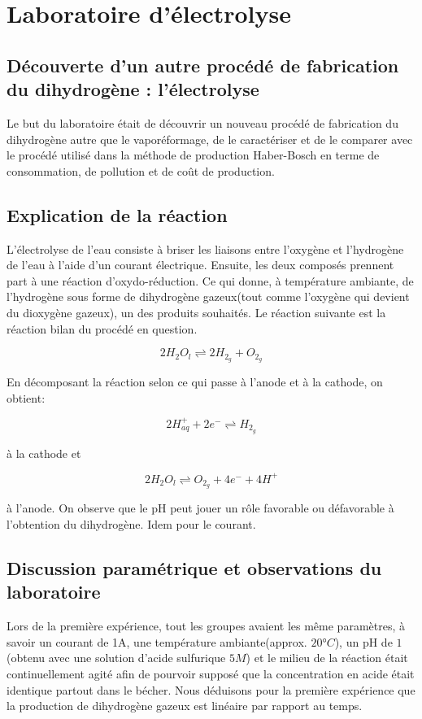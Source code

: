 \section{Laboratoire d'électrolyse}
\subsection{Découverte d'un autre procédé de fabrication du dihydrogène : l'électrolyse}
Le but du laboratoire était de découvrir un nouveau procédé de
fabrication du dihydrogène autre que le vaporéformage, de le
caractériser et de le comparer avec le procédé utilisé dans la
méthode de production Haber-Bosch en terme de consommation, de
pollution et de coût de production.

\subsection{Explication de la réaction}
L'électrolyse de l'eau consiste à briser les liaisons entre
l'oxygène et l'hydrogène de l'eau à l'aide d'un courant électrique.
Ensuite, les deux composés prennent part à une réaction d'oxydo-réduction.
Ce qui donne, à température ambiante, de l'hydrogène sous forme de
dihydrogène gazeux(tout comme l'oxygène qui devient du dioxygène gazeux),
un des produits souhaités. Le réaction suivante est la réaction bilan du
procédé en question.

$$2H_{2}O_{l} \rightleftharpoons 2 H_{2}_{g} + O_{2}_{g}$$

En décomposant la réaction selon ce qui passe à l'anode et à la cathode, 
on obtient:

$$2H^{+}_{aq} + 2 e^{-} \rightleftharpoons H_{2}_{g}$$

à la cathode et

$$2H_{2}O_{l} \rightleftharpoons O_{2}_{g} + 4 e^{-} + 4 H^{+}$$

à l'anode. On observe que le pH peut jouer un rôle favorable ou 
défavorable à l'obtention du dihydrogène. Idem pour le courant.

\subsection{Discussion paramétrique et observations du laboratoire}
Lors de la première expérience, tout les groupes avaient les même paramètres,
à savoir un courant de \unit{1}{A}, une température ambiante(approx. $20°C$),
un pH de $1$(obtenu avec une solution d'acide sulfurique $5M$) et le milieu de
la réaction était continuellement agité afin de pourvoir supposé que la 
concentration en acide était identique partout dans le bécher. Nous déduisons 
pour la première expérience que la production de dihydrogène gazeux est linéaire 
par rapport au temps.

